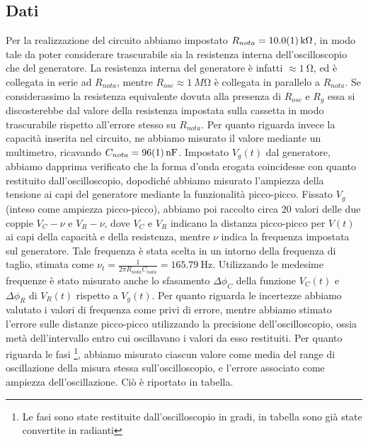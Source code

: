 \documentclass[a4paper]{article}
\begin{document}
\subsection{Dati}
Per la realizzazione del circuito abbiamo impostato $R_{nota} = \SI{10.0 \pm 0.1}{k\ohm}$, in modo tale da poter considerare trascurabile sia la resistenza interna dell'oscilloscopio che del generatore. La resistenza interna del generatore è infatti $\approx \SI{1}{\ohm}$, ed è collegata in serie ad $R_{nota}$, mentre $R_{osc} \approx \SI{1}{M\ohm}$ è collegata in parallelo a $R_{nota}$. Se considerassimo la resistenza equivalente dovuta alla presenza di $R_{osc}$ e $R_g$ essa si discosterebbe dal valore della resistenza impostata sulla cassetta in modo trascurabile rispetto all'errore stesso su $R_{nota}$.
Per quanto riguarda invece la capacità inserita nel circuito, ne abbiamo misurato il valore mediante un multimetro, ricavando $C_{nota} = \SI{96 \pm 1}{nF}$.
Impostato $V_g(t)$ dal generatore, abbiamo dapprima verificato che la forma d'onda erogata coincidesse con quanto restituito dall'oscilloscopio, dopodiché abbiamo misurato l'ampiezza della tensione ai capi del generatore mediante la funzionalità picco-picco. Fissato $V_g$ (inteso come ampiezza picco-picco), abbiamo poi raccolto circa 20 valori delle due coppie $V_C - \nu$ e $V_R - \nu$, dove $V_C$ e $V_R$ indicano la distanza picco-picco per $V(t)$ ai capi della capacità e della resistenza, mentre $\nu$ indica la frequenza impostata sul generatore. Tale frequenza è stata scelta in un intorno della frequenza di taglio, stimata come $\nu_t = \frac{1}{2\pi R_{nota}C_{nota}} = \SI{165.79}{\hertz}$.
Utilizzando le medesime frequenze è stato misurato anche lo sfasamento $\Delta\phi_C$ della funzione $V_C(t)$ e $\Delta\phi_R$ di $V_R(t)$ rispetto a $V_g(t)$. Per quanto riguarda le incertezze abbiamo valutato i valori di frequenza come privi di errore, mentre abbiamo stimato l'errore sulle distanze picco-picco utilizzando la precisione dell'oscilloscopio, ossia metà dell'intervallo entro cui oscillavano i valori da esso restituiti. Per quanto riguarda le fasi \footnote{Le fasi sono state restituite dall'oscilloscopio in gradi, in tabella sono già state convertite in radianti}, abbiamo misurato ciascun valore come media del range di oscillazione della misura stessa sull'oscilloscopio, e l'errore associato come ampiezza dell'oscillazione.
Ciò è riportato in tabella.
\end{document}
